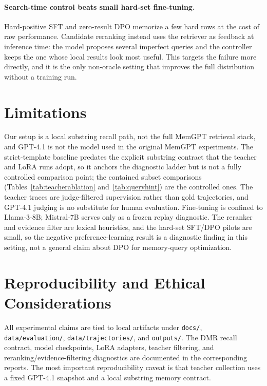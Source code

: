 \documentclass[11pt]{article}
\newcommand{\tool}[1]{\texttt{#1}}
\begin{document}
\paragraph{Search-time control beats small hard-set fine-tuning.}
Hard-positive SFT and zero-result DPO memorize a few hard rows at the cost of raw performance. Candidate reranking instead uses the retriever as feedback at inference time: the model proposes several imperfect queries and the controller keeps the one whose local results look most useful. This targets the failure more directly, and it is the only non-oracle setting that improves the full distribution without a training run.

\section{Limitations}

Our setup is a local substring recall path, not the full MemGPT retrieval stack, and GPT-4.1 is not the model used in the original MemGPT experiments. The strict-template baseline predates the explicit substring contract that the teacher and LoRA runs adopt, so it anchors the diagnostic ladder but is not a fully controlled comparison point; the contained subset comparisons (Tables~\ref{tab:teacherablation} and~\ref{tab:queryhint}) are the controlled ones. The teacher traces are judge-filtered supervision rather than gold trajectories, and GPT-4.1 judging is no substitute for human evaluation. Fine-tuning is confined to Llama-3-8B; Mistral-7B serves only as a frozen replay diagnostic. The reranker and evidence filter are lexical heuristics, and the hard-set SFT/DPO pilots are small, so the negative preference-learning result is a diagnostic finding in this setting, not a general claim about DPO for memory-query optimization.

\section{Reproducibility and Ethical Considerations}

All experimental claims are tied to local artifacts under \tool{docs/}, \tool{data/evaluation/}, \tool{data/trajectories/}, and \tool{outputs/}. The DMR recall contract, model checkpoints, LoRA adapters, teacher filtering, and reranking/evidence-filtering diagnostics are documented in the corresponding reports. The most important reproducibility caveat is that teacher collection uses a fixed GPT-4.1 snapshot and a local substring memory contract.
\end{document}
